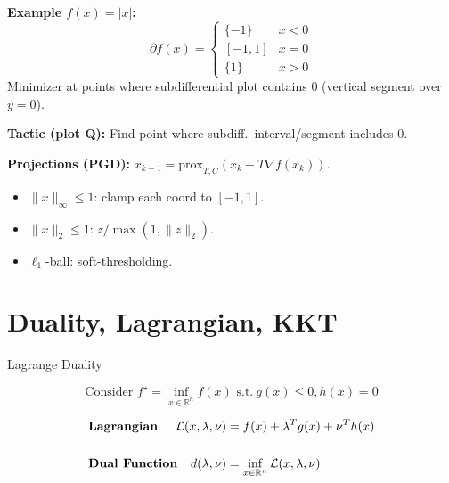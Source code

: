 \textbf{Example \(f(x)=|x|\):}
\[
  \partial f(x)=
  \begin{cases}
    \{-1\} & x<0\\
    [-1,1] & x=0\\
    \{1\} & x>0
  \end{cases}
\]
Minimizer at points where subdifferential plot contains \(0\)
(vertical segment over \(y=0\)).

\textbf{Tactic (plot Q):} Find point where subdiff.\ interval/segment
includes \(0\).

\textbf{Projections (PGD):} \(x_{k+1}=\mathrm{prox}_{T,C}(x_k-T\nabla f(x_k))\).
\begin{itemize}[leftmargin=*,itemsep=-1pt]
  \item \(\|x\|_\infty\le1\): clamp each coord to \([-1,1]\).
  \item \(\|x\|_2\le1\): \(z/\max(1,\|z\|_2)\).
  \item \(\ell_1\)-ball: soft-thresholding.
\end{itemize}

\section*{Duality, Lagrangian, KKT}

\begin{sstTitleBox}{
    Lagrange Duality
  }
  \begin{centering}
    \vspace{-1.5mm}
    \begin{equation}\text{Consider }
      f^\star = \inf_{x\in\mathcal{\mathbb{R}}^n}f(x)
      \text{ s.t.}\ g(x)\le0,h(x)=0
      \label{eq:dual}
    \end{equation}


    \begin{sstFullFrame}
      {\color{white}
        \vspace{-2mm}
        \[
          \begin{aligned}
            & \textbf{Lagrangian}
            & \hspace{-4mm}  \mathcal{L}(x,\lambda,\nu)
            & = f(x) + \lambda^T g(x)+\nu^T h(x)
            \\
            \\
            & \textbf{Dual Function}
            & \hspace{-4mm}    d(\lambda,\nu)            & = \inf_{x
            \in \mathcal{\mathbb{R}}^n}\mathcal{L}(x,\lambda,\nu)
        \end{aligned}\]
        \vspace{-2.7mm}
      }
    \end{sstFullFrame}
  \end{centering}
\end{sstTitleBox}

